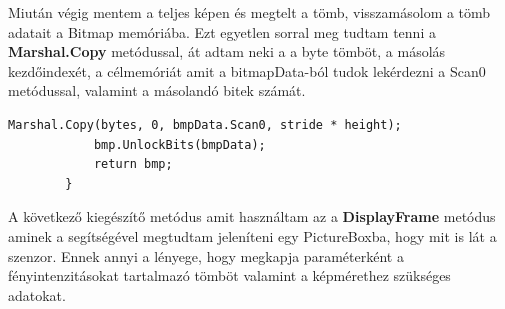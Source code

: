 \documentclass[]{thesis-ekf}
\theoremstyle{definition}
\theoremstyle{remark}
\begin{document}
		Miután végig mentem a teljes képen és megtelt a tömb, visszamásolom a tömb adatait a Bitmap memóriába. Ezt egyetlen sorral meg tudtam tenni a \textbf{Marshal.Copy}\cite{marshal.copy} metódussal, át adtam neki a a byte tömböt, a másolás kezdőindexét, a célmemóriát amit a bitmapData-ból tudok lekérdezni a Scan0 metódussal, valamint a másolandó bitek számát.
		\begin{lstlisting}[language=CSharp]	
			Marshal.Copy(bytes, 0, bmpData.Scan0, stride * height);
			bmp.UnlockBits(bmpData);
			return bmp;
		}
	\end{lstlisting}
	A következő kiegészítő metódus amit használtam az a \textbf{DisplayFrame} metódus aminek a segítségével megtudtam jeleníteni egy PictureBoxba, hogy mit is lát a szenzor. Ennek annyi a lényege, hogy megkapja paraméterként a fényintenzitásokat tartalmazó tömböt valamint a képmérethez szükséges adatokat. 
	
\end{document}
